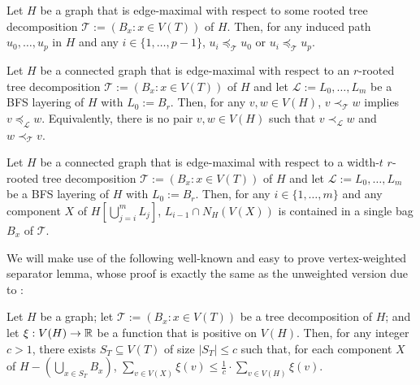 \documentclass[kpfonts]{patmorin}
\theoremstyle{named}
\begin{document}
 \begin{obs}\label{induced-unimodal}
     Let $H$ be a graph that is edge-maximal with respect to some rooted tree decomposition $\mathcal{T}:=(B_x:x\in V(T))$ of $H$.  Then, for any induced path $u_0,\ldots,u_p$ in $H$ and any $i\in\{1,\ldots,p-1\}$, $u_i\preceq_\mathcal{T} u_0$ or $u_i\preceq_\mathcal{T} u_p$.
 \end{obs}


\begin{obs}\label{order-relation}
    Let $H$ be a connected graph that is edge-maximal with respect to an $r$-rooted tree decomposition $\mathcal{T}:=(B_x:x\in V(T))$ of $H$ and let $\mathcal{L}:=L_0,\ldots,L_m$ be a BFS layering of $H$ with $L_0:=B_r$.  Then, for any $v,w\in V(H)$, $v\prec_{\mathcal{T}}w$ implies $v\preceq_{\mathcal{L}}w$. Equivalently, there is no pair $v,w\in V(H)$ such that $v\prec_{\mathcal{L}}w$ and $w\prec_{\mathcal{T}}v$.
\end{obs}

\begin{obs}\label{up-neighbours}
    Let $H$ be a connected graph that is edge-maximal with respect to a width-$t$ $r$-rooted tree decomposition $\mathcal{T}:=(B_x:x\in V(T))$ of $H$ and let $\mathcal{L}:=L_0,\ldots,L_m$ be a BFS layering of $H$ with $L_0:=B_r$. Then, for any $i\in\{1,\ldots,m\}$ and any component $X$ of $H[\bigcup_{j=i}^m L_j]$, $L_{i-1}\cap N_H(V(X))$ is contained in a single bag $B_x$ of $\mathcal{T}$.
\end{obs}



We will make use of the following well-known and easy to prove vertex-weighted separator lemma, whose proof is exactly the same as the unweighted version due to \citet{robertson.seymour:graph}:

\begin{lem}\label{weighted-separator}
    Let $H$ be a graph; let $\mathcal{T}:=(B_x:x\in V(T))$ be a tree decomposition of $H$; and let $\xi:V(H)\to\mathbb{R}$ be a function that is positive on $V(H)$.  Then, for any integer $c>1$, there exists $S_T\subseteq V(T)$ of size $|S_T|\le c$ such that, for each component $X$ of $H-(\bigcup_{x\in S_T} B_x)$, $\sum_{v\in V(X)} \xi(v) \le \tfrac{1}{c}\cdot\sum_{v\in V(H)} \xi(v)$.
\end{lem}
\end{document}
